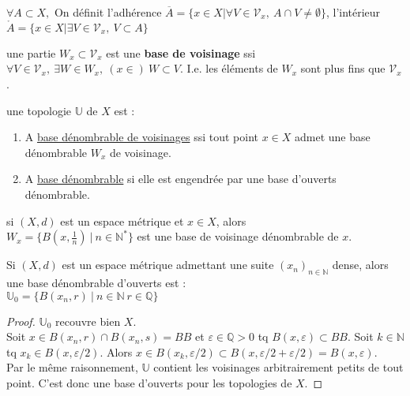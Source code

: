 \begin{definition}
$\forall A\subset X,$ On définit l'adhérence $\overline{A}=\{x\in X|\forall V\in \mathcal{V}_x,\ A\cap V\neq \emptyset  \}$, l'intérieur $\mathring{A}=\{x\in X|\exists V\in \mathcal{V}_x,\ V\subset A\}$
\end{definition}
\begin{definition}
    une partie $W_x\subset \mathcal{V}_x$ est une \textbf{base de voisinage} ssi \\$\forall V\in \mathcal{V}_x, \ \exists W\in W_x,\ (x \in )~W\subset V$. I.e. les éléments de $W_x$ sont plus fins que $\mathcal{V}_x$.
\end{definition}
\begin{definition}
     une topologie $\mathbb{U}$ de $X$ est :
\begin{enumerate}
    \item A \underline{base dénombrable de voisinages} ssi tout point $x\in X$ admet une base dénombrable $W_x$ de voisinage.
    \item A \underline{base dénombrable} si elle est engendrée par une base d'ouverts dénombrable.
\end{enumerate}
\end{definition}
\begin{remarque}
    si $(X,d)$ est un espace métrique et $x\in X$, alors \\
    $W_x=\{B(x,\frac{1}{n})\ |\ n\in \mathbb{N} ^*\}$ est une base de voisinage dénombrable de $x$.
\end{remarque}
\begin{remarque}
    Si $(X,d)$ est un espace métrique admettant une suite $(x_n)_{n\in \mathbb{N} }$ dense, alors une base dénombrable d'ouverts est :\\
    $\mathbb{U}_0=\{B(x_{n}, r)\ |\ n\in \mathbb{N} \ r\in \mathbb{Q} \}$
\end{remarque}
\begin{proof}
    $\mathbb{U}_0$ recouvre bien $X$. \\
    Soit $x\in B(x_{n}, r)\cap B(x_{n}, s)=BB$ et $\varepsilon\in \mathbb{Q} >0 $ tq $B(x,\varepsilon )\subset BB$. Soit $k\in \mathbb{N} $ tq $x_k\in B(x,\varepsilon /2)$. Alors $x\in B(x_k, \varepsilon /2)\subset B(x,\varepsilon /2 + \varepsilon /2)=B(x,\varepsilon)$. \\

\noindent Par le même raisonnement, $\mathbb{U}$ contient les voisinages arbitrairement petits de tout point. C'est donc une base d'ouverts pour les topologies de $X$.
\end{proof}
